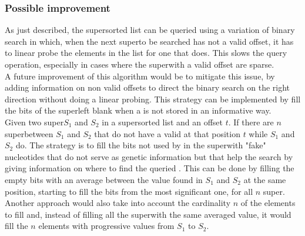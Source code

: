 \subsubsection{Possible improvement}
As just described, the super\kmer sorted list can be queried using a variation of binary search in which, when the next super\kmer to be searched has not a valid offset, it has to linear probe the elements in the list for one that does. This slows the query operation, especially in cases where the super\kmers with a valid offset are sparse. \\
A future improvement of this algorithm would be to mitigate this issue, by adding information on non valid offsets to direct the binary search on the right direction without doing a linear probing. This strategy can be implemented by fill the bits of the super\kmer left blank when a \kmer is not stored in an informative way.\\
Given two super\kmers $S_1$ and $S_2$ in a super\kmer sorted list and an offset $t$. If there are $n$ super\kmers between $S_1$ and $S_2$ that do not have a valid \kmer at that position $t$ while $S_1$ and $S_2$ do. The strategy is to fill the bits not used by \kmers in the super\kmer with "fake" nucleotides that do not serve as genetic information but that help the search by giving information on where to find the queried \kmer. This can be done by filling the empty bits with an average between the value found in $S_1$ and $S_2$ at the same position, starting to fill the bits from the most significant one, for all $n$ super\kmers. Another approach would also take into account the cardinality $n$ of the elements to fill and, instead of filling all the super\kmers with the same averaged value, it would fill the $n$ elements with progressive values from $S_1$ to $S_2$.

